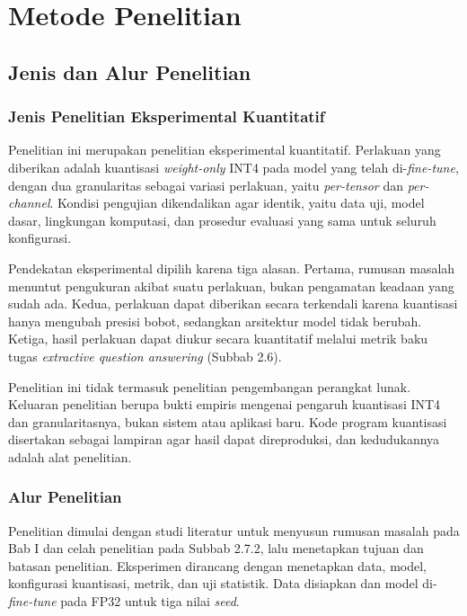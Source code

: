 %
%

\chapter{Metode Penelitian}

\section{Jenis dan Alur Penelitian}

\subsection{Jenis Penelitian Eksperimental Kuantitatif}

Penelitian ini merupakan penelitian eksperimental kuantitatif. Perlakuan yang diberikan adalah kuantisasi \textit{weight-only} INT4 pada model yang telah di-\textit{fine-tune}, dengan dua granularitas sebagai variasi perlakuan, yaitu \textit{per-tensor} dan \textit{per-channel}. Kondisi pengujian dikendalikan agar identik, yaitu data uji, model dasar, lingkungan komputasi, dan prosedur evaluasi yang sama untuk seluruh konfigurasi.

Pendekatan eksperimental dipilih karena tiga alasan. Pertama, rumusan masalah menuntut pengukuran akibat suatu perlakuan, bukan pengamatan keadaan yang sudah ada. Kedua, perlakuan dapat diberikan secara terkendali karena kuantisasi hanya mengubah presisi bobot, sedangkan arsitektur model tidak berubah. Ketiga, hasil perlakuan dapat diukur secara kuantitatif melalui metrik baku tugas \textit{extractive question answering} (Subbab 2.6).

Penelitian ini tidak termasuk penelitian pengembangan perangkat lunak. Keluaran penelitian berupa bukti empiris mengenai pengaruh kuantisasi INT4 dan granularitasnya, bukan sistem atau aplikasi baru. Kode program kuantisasi disertakan sebagai lampiran agar hasil dapat direproduksi, dan kedudukannya adalah alat penelitian.

\subsection{Alur Penelitian}

Penelitian dimulai dengan studi literatur untuk menyusun rumusan masalah pada Bab I dan celah penelitian pada Subbab 2.7.2, lalu menetapkan tujuan dan batasan penelitian. Eksperimen dirancang dengan menetapkan data, model, konfigurasi kuantisasi, metrik, dan uji statistik. Data disiapkan dan model di-\textit{fine-tune} pada FP32 untuk tiga nilai \textit{seed}.

